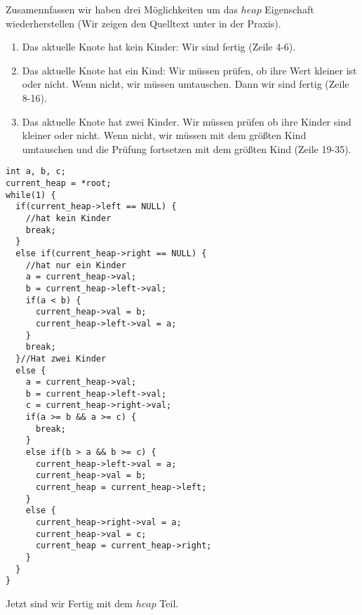 Zusamennfassen wir haben drei Möglichkeiten um das $heap$ Eigenschaft wiederherstellen
(Wir zeigen den Quelltext unter in der Praxis).
\begin{enumerate}
\item Das aktuelle Knote hat kein Kinder: Wir sind fertig (Zeile 4-6).
\item Das aktuelle Knote hat ein Kind: Wir müssen prüfen, ob ihre Wert kleiner ist oder nicht.
Wenn nicht, wir müssen umtauschen. Dann wir sind fertig (Zeile 8-16).
\item Das aktuelle Knote hat zwei Kinder. Wir müssen prüfen ob ihre Kinder sind kleiner oder nicht.
Wenn nicht, wir müssen mit dem größten Kind umtauschen und die Prüfung fortsetzen mit dem größten Kind (Zeile 19-35).
\end{enumerate}
\begin{lstlisting}
int a, b, c;
current_heap = *root;
while(1) {
  if(current_heap->left == NULL) {
    //hat kein Kinder
    break;
  }
  else if(current_heap->right == NULL) {
    //hat nur ein Kinder
    a = current_heap->val;
    b = current_heap->left->val;
    if(a < b) {
      current_heap->val = b;
      current_heap->left->val = a;
    }
    break;
  }//Hat zwei Kinder
  else {
    a = current_heap->val;
    b = current_heap->left->val;
    c = current_heap->right->val;
    if(a >= b && a >= c) {
      break;
    }
    else if(b > a && b >= c) {
      current_heap->left->val = a;
      current_heap->val = b;
      current_heap = current_heap->left;
    }
    else {
      current_heap->right->val = a;
      current_heap->val = c;
      current_heap = current_heap->right;
    }
  }
}
\end{lstlisting}
Jetzt sind wir Fertig mit dem $heap$ Teil.

